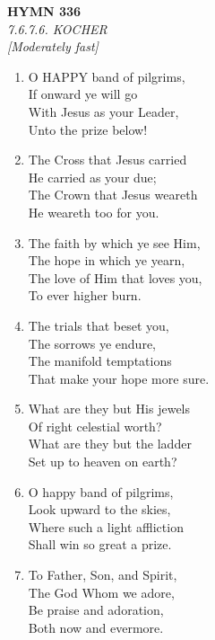 \newpage
\begin{center}
    {\Large \textbf{HYMN 336}}
    \\
    \textit{7.6.7.6. KOCHER}
    \\
    \textit{\small [Moderately fast]}
\end{center}
\vspace{1em}

\begin{enumerate}
    \item O HAPPY band of pilgrims, \\
        If onward ye will go \\
        With Jesus as your Leader, \\
        Unto the prize below!

    \item The Cross that Jesus carried \\
        He carried as your due; \\
        The Crown that Jesus weareth \\
        He weareth too for you.

    \item The faith by which ye see Him, \\
        The hope in which ye yearn, \\
        The love of Him that loves you, \\
        To ever higher burn.

    \item The trials that beset you, \\
        The sorrows ye endure, \\
        The manifold temptations \\
        That make your hope more sure.

    \item What are they but His jewels \\
        Of right celestial worth? \\
        What are they but the ladder \\
        Set up to heaven on earth?

    \item O happy band of pilgrims, \\
        Look upward to the skies, \\
        Where such a light affliction \\
        Shall win so great a prize.

    \item To Father, Son, and Spirit, \\
        The God Whom we adore, \\
        Be praise and adoration, \\
        Both now and evermore.

\end{enumerate}

